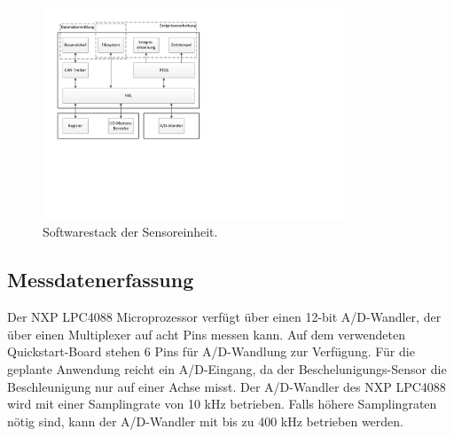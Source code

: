 \begin{figure}[H]
	\centering
		\includegraphics[width=0.8\textwidth]{images/visio/Softwarestack_Sensor.pdf}
	\caption{Softwarestack der Sensoreinheit.}
	\label{fig.sw_sensor}
\end{figure}



\subsection{Messdatenerfassung}\label{subsec.sw_messen}
Der NXP LPC4088 Microprozessor verfügt über einen 12-bit A/D-Wandler, der über einen Multiplexer auf acht Pins messen kann. Auf dem verwendeten Quickstart-Board stehen 6 Pins für A/D-Wandlung zur Verfügung. Für die geplante Anwendung reicht ein A/D-Eingang, da der Beschelunigungs-Sensor die Beschleunigung nur auf einer Achse misst. Der A/D-Wandler des NXP LPC4088 wird mit einer Samplingrate von 10 kHz betrieben. Falls höhere Samplingraten nötig sind, kann der A/D-Wandler mit bis zu 400 kHz betrieben werden.



